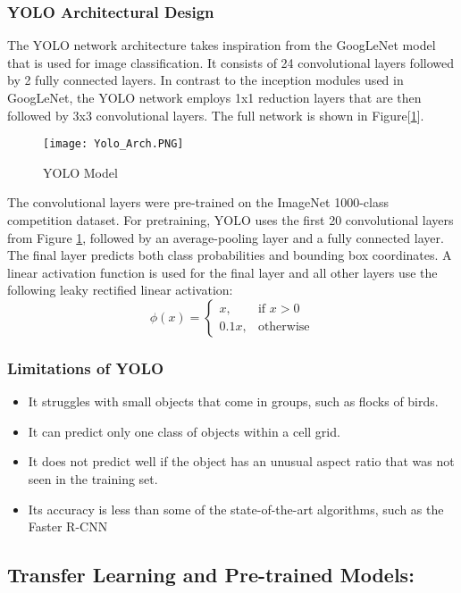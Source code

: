 \subsubsection{YOLO Architectural Design}
The YOLO network architecture takes inspiration from the GoogLeNet model that is used for image classification. It consists of 24 convolutional layers followed by 2 fully connected layers. In contrast to the inception modules used in GoogLeNet, the YOLO network employs 1x1 reduction layers that are then followed by 3x3 convolutional layers. The full network is shown in Figure[\ref{fig:YOLO_arc}].
\begin{figure}[H]
    \centering
    \texttt{[image: Yolo\_Arch.PNG]}
    \caption{YOLO Model}
    \label{fig:YOLO_arc}
\end{figure}
The convolutional layers were pre-trained on the ImageNet 1000-class competition dataset. For pretraining, YOLO uses the first 20 convolutional layers from Figure \ref{fig:YOLO_arc}, followed by an average-pooling layer and a fully connected layer. The final layer predicts both class probabilities and bounding box coordinates. A linear activation function is used for the final layer and
all other layers use the following leaky rectified linear activation:
 \[
 \phi(x)=\begin{cases}
           x, & \text{if } x>0 \\
          0.1x, & \text{otherwise}
      \end{cases}
\]

\subsubsection{Limitations of YOLO}
\begin{itemize}
    \item It struggles with small objects that come in groups, such as flocks of birds.
    \item It can predict only one class of objects within a cell grid.
    \item It does not predict well if the object has an unusual aspect ratio that was not seen in the training set.
    \item Its accuracy is less than some of the state-of-the-art algorithms, such as the Faster R-CNN
\end{itemize}

\subsection{Transfer Learning and Pre-trained Models:}

